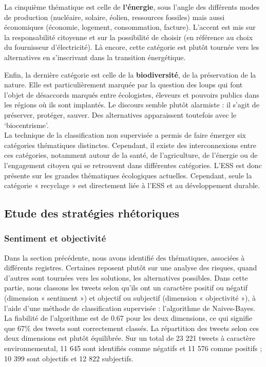         La cinquième thématique est celle de\textbf{ l’énergie}, sous l’angle des différents modes de production (nucléaire, solaire, éolien, ressources fossiles) mais aussi économiques (économie, logement, consommation, facture). L’accent est mis sur la responsabilité citoyenne et sur la possibilité de choisir (en référence au choix du fournisseur d’électricité). Là encore, cette catégorie est plutôt tournée vers les alternatives en s’inscrivant dans la transition énergétique.

        Enfin, la dernière catégorie est celle de la \textbf{biodiversité}, de la préservation de la nature. Elle est particulièrement marquée par la question des loups qui font l’objet de désaccords marqués entre écologistes, éleveurs et pouvoirs publics dans les régions où ils sont implantés. Le discours semble plutôt alarmiste : il s’agit de préserver, protéger, sauver.  Des alternatives apparaissent toutefois avec le ‘biocentrisme’. \\

        La technique de la classification non supervisée a permis de faire émerger six catégories thématiques distinctes. Cependant, il existe des interconnexions entre ces catégories, notamment autour de la santé, de l’agriculture, de l’énergie ou de l’engagement citoyen qui se retrouvent dans différentes catégories. L’ESS est donc présente sur les grandes thématiques écologiques actuelles. Cependant, seule la catégorie « recyclage » est directement liée à l’ESS et au développement durable.


    \subsection{Etude des stratégies rhétoriques}

        \subsubsection{Sentiment et objectivité}

            Dans la section précédente, nous avons identifié des thématiques, associées à différents registres. Certaines reposent plutôt sur une analyse des risques, quand d’autres sont tournées vers les solutions, les alternatives possibles.  Dans cette partie, nous classons les tweets selon qu’ils ont un caractère positif ou négatif (dimension « sentiment ») et objectif ou subjectif (dimension « objectivité »), à l’aide d’une méthode de classification supervisée : l’algorithme de Naives-Bayes. La fiabilité de l’algorithme est de 0.67 pour les deux dimensions, ce qui signifie que 67\% des tweets sont correctement classés. La répartition des tweets selon ces deux dimensions est plutôt équilibrée. Sur un total de 23 221 tweets à caractère environnemental, 11 645 sont identifiés comme négatifs et 11 576 comme positifs ; 10 399 sont objectifs et 12 822 subjectifs.

